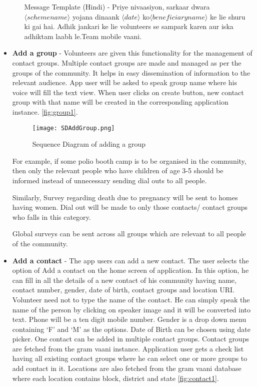 \begin{itemize}
\begin{enumerate}
Message Template (Hindi) - Priye nivaasiyon​, sarkaar dwara $\langle schemename \rangle$ yojana dinaank $\langle date \rangle$ ko ​$\langle beneficiaryname \rangle$ ke lie ​shuru ki gai hai. Adhik jankari ke lie volunteers se sampark karen aur iska adhiktam laabh le.Team mobile vaani.
\end{enumerate}


\item \textbf {Add a group} - Volunteers are given this functionality for the management of contact groups. Multiple contact groups are made and managed as per the groups of the community. It helps in easy dissemination of information to the relevant audience. App user will be asked to speak group name where his voice will fill the text view. When user clicks on create button, new contact group with that name will be created in the corresponding application instance. \ref{fig:group1}.

\begin{figure}[H]
    \centering
	\texttt{[image: SDAddGroup.png]}
    \caption{ Sequence Diagram of adding a group}
    \label{fig:Sequence Diagram of Adding a Group}
\end{figure}

For example, if some polio booth camp is to be organised in the community, then only the relevant people who have children of age 3-5 should be informed instead of unnecessary sending dial outs to all people.

Similarly, Survey regarding death due to pregnancy will be sent to homes having women. Dial out will be made to only those contacts/ contact groups who falls in this category. 

Global surveys can be sent across all groups which are relevant to all people of the community.

 \item \textbf {Add a contact} - The app users can add a new contact. The user selects the option of Add a contact on the  home screen of application. In this option, he can fill in all the details of a new contact of his community having name, contact number, gender, date of birth, contact groups and location URI. Volunteer need not to type the name of the contact. He can simply speak the name of the person by clicking on speaker image and it will be converted into text. Phone will be a ten digit mobile number. Gender is a drop down menu containing ‘F’ and ‘M’ as the options. Date of Birth can be chosen using date picker. One contact can be added in multiple  contact groups. Contact groups are fetched from the gram vaani instance. Application user gets a check list having all existing contact groups where he can select one or more groups to add contact in it. Locations are also fetched from the gram vaani database where each location contains block, district and state \ref{fig:contact1}.
 

\end{itemize}
